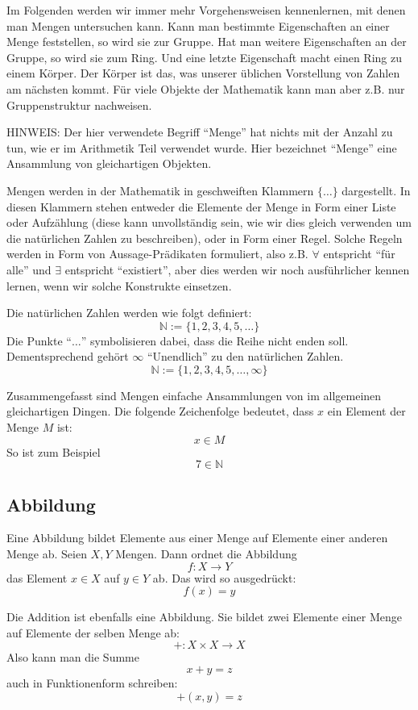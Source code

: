 Im Folgenden werden wir immer mehr Vorgehensweisen kennenlernen, mit denen man Mengen untersuchen kann. Kann man bestimmte Eigenschaften an einer Menge feststellen, so wird sie zur Gruppe. Hat man weitere Eigenschaften an der Gruppe, so wird sie zum Ring. Und eine letzte Eigenschaft macht einen Ring zu einem Körper. Der Körper ist das, was unserer üblichen Vorstellung von Zahlen am nächsten kommt. Für viele Objekte der Mathematik kann man aber z.B. nur Gruppenstruktur nachweisen. 

\begin{svgraybox}
HINWEIS: Der hier verwendete Begriff "`Menge"' hat nichts mit der Anzahl zu tun, wie er im Arithmetik Teil verwendet wurde. Hier bezeichnet "`Menge"' eine Ansammlung von gleichartigen Objekten.
\end{svgraybox}

Mengen werden in der Mathematik in geschweiften Klammern $\{\dots \}$ dargestellt. In diesen Klammern stehen entweder die Elemente der Menge in Form einer Liste oder Aufzählung (diese kann unvollständig sein, wie wir dies gleich verwenden um die natürlichen Zahlen zu beschreiben), oder in Form einer Regel. Solche Regeln werden in Form von Aussage-Prädikaten formuliert, also z.B. $\forall$ entspricht "`für alle"' und $\exists$ entspricht "`existiert"', aber dies werden wir noch ausführlicher kennen lernen, wenn wir solche Konstrukte einsetzen. 

Die natürlichen Zahlen werden wie folgt definiert:
\[\mathbb{N} := \{ 1,2,3,4,5, \dots \} \]
Die Punkte "`$\dots$"' symbolisieren dabei, dass die Reihe nicht enden soll. Dementsprechend gehört $\infty$ "`Unendlich"' zu den natürlichen Zahlen.
\[\mathbb{N} := \{ 1,2,3,4,5, \dots, \infty \} \]

Zusammengefasst sind Mengen einfache Ansammlungen von im allgemeinen gleichartigen Dingen. Die folgende Zeichenfolge bedeutet, dass $x$ ein Element der Menge $M$ ist:
\[x \in M \]
So ist zum Beispiel
\[7 \in \mathbb{N} \]

\subsection{Abbildung}

Eine Abbildung bildet Elemente aus einer Menge auf Elemente einer anderen Menge ab. Seien $X,Y$ Mengen. Dann ordnet die Abbildung
\[ f : X \longrightarrow Y \]
das Element $x\in X$ auf $y\in Y$ ab. Das wird so ausgedrückt:
\[ f(x) = y\]

Die Addition ist ebenfalls eine Abbildung. Sie bildet zwei Elemente einer Menge auf Elemente der selben Menge ab:
\[ + : X \times X \longrightarrow X \]
Also kann man die Summe 
\[ x+y = z\]
auch in Funktionenform schreiben:
\[ +(x,y) = z\]


